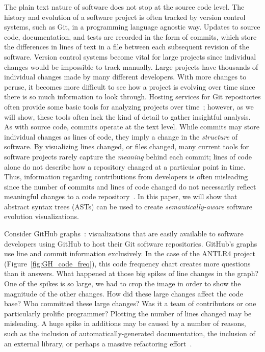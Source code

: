 The plain text nature of software does not stop at the source code level. The history and evolution of a software project is often tracked by version control systems, such as Git, in a programming language agnostic way. Updates to source code, documentation, and tests are recorded in the form of commits, which store the differences in lines of text in a file between each subsequent revision of the software. Version control systems become vital for large projects since individual changes would be impossible to track manually. Large projects have thousands of individual changes made by many different developers. With more changes to peruse, it becomes more difficult to see how a project is evolving over time since there is so much information to look through. Hosting services for Git repositories often provide some basic tools for analyzing projects over time~\cite{github-graphs,bitbucket-graphs}; however, as we will show, these tools often lack the kind of detail to gather insightful analysis. As with source code, commits operate at the text level. While commits may store individual changes as lines of code, they imply a change in the \emph{structure} of software.  By visualizing lines changed, or files changed, many current tools for software projects rarely capture the \emph{meaning} behind each commit; lines of code alone do not describe how a repository changed at a particular point in time. Thus, information regarding contributions from developers is often misleading since the number of commits and lines of code changed do not necessarily reflect meaningful changes to a code repository~\cite{robles2014}. In this paper, we will show that abstract syntax trees (ASTs) can be used to create \emph{semantically-aware} software evolution visualizations.

Consider GitHub graphs~\cite{github-graphs}: visualizations that are easily available to software developers using GitHub to host their Git software repositories. GitHub's graphs use line and commit information exclusively. In the case of the ANTLR4 project (Figure~\ref{fig:GH_code_freq}), this code frequency chart creates more questions than it answers. What happened at those big spikes of line changes in the graph? One of the spikes is so large, we had to crop the image in order to show the magnitude of the other changes. How did these large changes affect the code base? Who committed these large changes? Was it a team of contributors or one particularly prolific programmer? Plotting the number of lines changed may be misleading. A huge spike in additions may be caused by a number of reasons, such as the inclusion of automatically-generated documentation, the inclusion of an external library, or perhaps a massive refactoring effort~\cite{Hindle:2008:LCT:1370750.1370773}.

